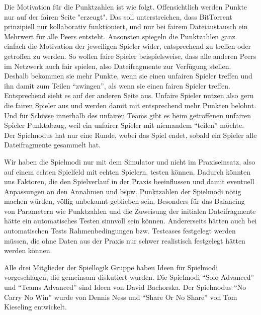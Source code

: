 Die Motivation für die Punktzahlen ist wie folgt. Offensichtlich werden Punkte nur auf der fairen Seite "erzeugt". Das soll unterstreichen, dass BitTorrent prinzipiell nur kollaborativ funktioniert, und nur bei fairem Dateiaustausch ein Mehrwert für alle Peers entsteht. Ansonsten spiegeln die Punktzahlen ganz einfach die Motivation der jeweiligen Spieler wider, entsprechend zu treffen oder getroffen zu werden. So wollen faire Spieler beispielsweise, dass alle anderen Peers im Netzwerk auch fair spielen, also Dateifragmente zur Verfügung stellen. Deshalb bekommen sie mehr Punkte, wenn sie einen unfairen Spieler treffen und ihn damit zum Teilen “zwingen”, als wenn sie einen fairen Spieler treffen. Entsprechend sieht es auf der anderen Seite aus. Unfaire Spieler nutzen also gern die fairen Spieler aus und werden damit mit entsprechend mehr Punkten belohnt. Und für Schüsse innerhalb des unfairen Teams gibt es beim getroffenen unfairen Spieler Punktabzug, weil ein unfairer Spieler mit niemandem “teilen” möchte.
Der Spielmodus hat nur eine Runde, wobei das Spiel endet, sobald ein Spieler alle Dateifragmente gesammelt hat.

Wir haben die Spielmodi nur mit dem Simulator und nicht im Praxiseinsatz, also auf einem echten Spielfeld mit echten Spielern, testen können. Dadurch könnten uns Faktoren, die den Spielverlauf in der Praxis beeinflussen und damit eventuell Anpassungen an den Annahmen und bspw. Punktzahlen der Spielmodi nötig machen würden, völlig unbekannt geblieben sein. Besonders für das Balancing von Parametern wie Punktzahlen und die Zuweisung der initialen Dateifragmente hätte ein automatisches Testen sinnvoll sein können. Andererseits hätten auch bei automatischen Tests Rahmenbedingungen bzw. Testcases festgelegt werden müssen, die ohne Daten aus der Praxis nur schwer realistisch festgelegt hätten werden können.

Alle drei Mitglieder der Spiellogik Gruppe haben Ideen für Spielmodi vorgeschlagen, die gemeinsam diskutiert wurden. Die Spielmodi “Solo Advanced” und “Teams Advanced” sind Ideen von David Bachorska. Der Spielmodus “No Carry No Win” wurde von Dennis Ness und “Share Or No Share” von Tom Kieseling entwickelt.
